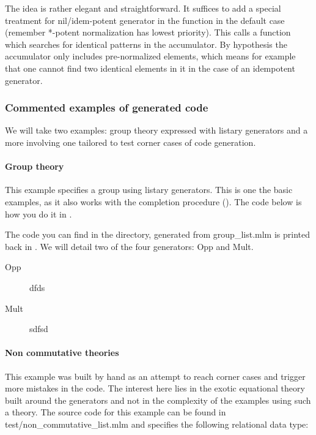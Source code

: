 The idea is rather elegant and straightforward. It suffices to add a
special treatment for nil/idem-potent generator in the \insertf
function in the default case (remember  *-potent normalization has
lowest priority). This calls a function which searches for identical
patterns in the accumulator. By hypothesis the accumulator only
includes pre-normalized elements, which means for example that one
cannot find two identical elements in it in the case of an idempotent
generator. 


\subsubsection{Commented examples of generated code}

We will take two examples:  group theory  expressed with listary
generators and a more involving one tailored to test corner cases of
code generation.

\paragraph{Group theory}
\label{sec:list_group_theory}
This example specifies a group using listary generators. This is one
the basic examples, as it also works with the completion procedure
(). The code below is how you do it in \moca.



The code you can find in the \testd directory, generated from
{\sf group\_list.mlm} is printed back in .
We will detail two of the four generators: {\sf Opp} and {\sf Mult}.


  \begin{description}
  \item[Opp]dfds
    

\item[Mult]sdfsd
  
  \end{description}




\paragraph{Non commutative theories}
\label{sec:nc_theory}

This example was built by hand as an attempt to reach corner cases and
trigger more mistakes in the code. The interest here lies in the
exotic equational theory built around the generators and not in the
complexity of the examples using such a theory.
The \moca source code for this example can be found in {\sf
  test/non\_commutative\_list.mlm} and specifies the following
relational data type:

